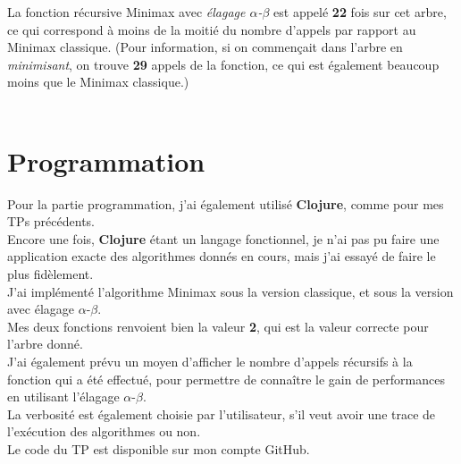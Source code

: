 \documentclass[11pt]{article}
\begin{document}
La fonction récursive Minimax avec \emph{élagage \(\alpha\)-\(\beta\)} est appelé \textbf{22} fois sur cet arbre, ce qui correspond à moins de la moitié du nombre d'appels par rapport au Minimax classique. (Pour information, si on commençait dans l'arbre en \emph{minimisant}, on trouve \textbf{29} appels de la fonction, ce qui est également beaucoup moins que le Minimax classique.)\\

\pagebreak\\
\section{Programmation}
\label{sec:org7ade6be}
Pour la partie programmation, j'ai également utilisé \textbf{Clojure}, comme pour mes TPs précédents.\\

Encore une fois, \textbf{Clojure} étant un langage fonctionnel, je n'ai pas pu faire une application exacte des algorithmes donnés en cours, mais j'ai essayé de faire le plus fidèlement.\\
J'ai implémenté l'algorithme Minimax sous la version classique, et sous la version avec élagage \(\alpha\)-\(\beta\).\\

Mes deux fonctions renvoient bien la valeur \textbf{2}, qui est la valeur correcte pour l'arbre donné.\\
J'ai également prévu un moyen d'afficher le nombre d'appels récursifs à la fonction qui a été effectué, pour permettre de connaître le gain de performances en utilisant l'élagage \(\alpha\)-\(\beta\).\\

La verbosité est également choisie par l'utilisateur, s'il veut avoir une trace de l'exécution des algorithmes ou non.\\

Le code du TP est disponible sur mon compte GitHub.\\
\end{document}
